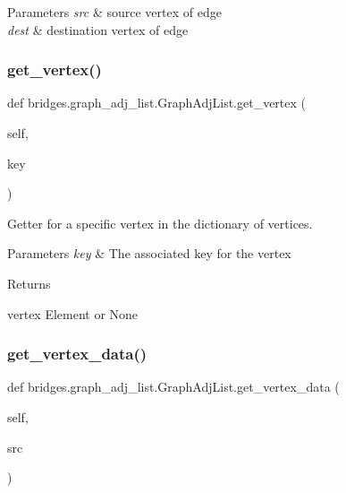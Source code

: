 \begin{DoxyParams}{Parameters}
{\em src} & source vertex of edge \\
\hline
{\em dest} & destination vertex of edge \\
\hline
\end{DoxyParams}
\mbox{\label{classbridges_1_1graph__adj__list_1_1_graph_adj_list_af484d881d91177e723faf8b8a5c427e2}} 
\subsubsection{\texorpdfstring{get\+\_\+vertex()}{get\_vertex()}}
{\footnotesize\ttfamily def bridges.\+graph\+\_\+adj\+\_\+list.\+Graph\+Adj\+List.\+get\+\_\+vertex (\begin{DoxyParamCaption}\item[{}]{self,  }\item[{}]{key }\end{DoxyParamCaption})}



Getter for a specific vertex in the dictionary of vertices. 


\begin{DoxyParams}{Parameters}
{\em key} & The associated key for the vertex \\
\hline
\end{DoxyParams}
\begin{DoxyReturn}{Returns}


vertex Element or None 
\end{DoxyReturn}
\mbox{\label{classbridges_1_1graph__adj__list_1_1_graph_adj_list_a0523e2e842042c131dcbe4fd66a6a296}} 
\subsubsection{\texorpdfstring{get\+\_\+vertex\+\_\+data()}{get\_vertex\_data()}}
{\footnotesize\ttfamily def bridges.\+graph\+\_\+adj\+\_\+list.\+Graph\+Adj\+List.\+get\+\_\+vertex\+\_\+data (\begin{DoxyParamCaption}\item[{}]{self,  }\item[{}]{src }\end{DoxyParamCaption})}



